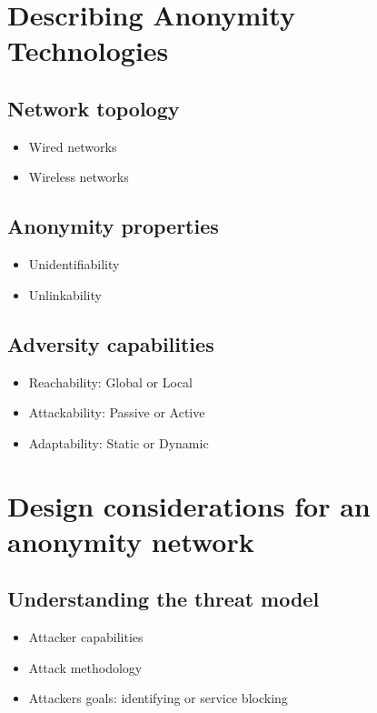 \documentclass{llncs}
\begin{document}
\section{Describing Anonymity Technologies} \label{taxonomy}
\subsection{ Network topology}
\begin{itemize}
	\item{Wired networks}
	\item{Wireless networks}
\end{itemize}
\subsection{Anonymity properties}
\begin{itemize}
	\item{Unidentifiability}
	\item{Unlinkability}
\end{itemize}
\subsection{Adversity capabilities}
\begin{itemize}
	\item{Reachability: Global or Local}
	\item{Attackability: Passive or Active}
	\item{Adaptability: Static or Dynamic}
\end{itemize}

\section{Design considerations for an anonymity network} \label{design}
\subsection{Understanding the threat model}
\begin{itemize}
	\item{Attacker capabilities}
	\item{Attack methodology}
	\item{Attackers goals: identifying or service blocking}
\end{itemize}
\end{document}
